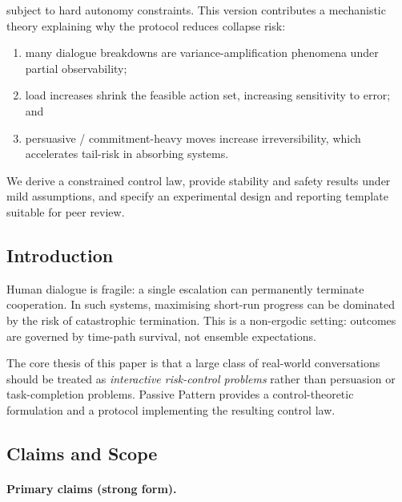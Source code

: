 \noindent
subject to hard autonomy constraints. This version contributes a
mechanistic theory explaining why the protocol reduces collapse
risk:

\begin{enumerate}[label=(\alph*)]
\item many dialogue breakdowns are variance-amplification phenomena
under partial observability;
\item load increases shrink the feasible action set, increasing
sensitivity to error; and
\item persuasive / commitment-heavy moves increase irreversibility,
which accelerates tail-risk in absorbing systems.
\end{enumerate}

\noindent
We derive a constrained control law, provide stability and safety
results under mild assumptions, and specify an experimental design
and reporting template suitable for peer review.

\subsection{Introduction}
\label{sec:pp-introduction}

Human dialogue is fragile: a single escalation can permanently
terminate cooperation. In such systems, maximising short-run
progress can be dominated by the risk of catastrophic termination.
This is a non-ergodic setting: outcomes are governed by time-path
survival, not ensemble expectations.

The core thesis of this paper is that a large class of real-world
conversations should be treated as \emph{interactive risk-control
problems} rather than persuasion or task-completion problems.
Passive Pattern provides a control-theoretic formulation and a
protocol implementing the resulting control law.

\subsection{Claims and Scope}
\label{sec:pp-claims-scope}

\paragraph{Primary claims (strong form).}

